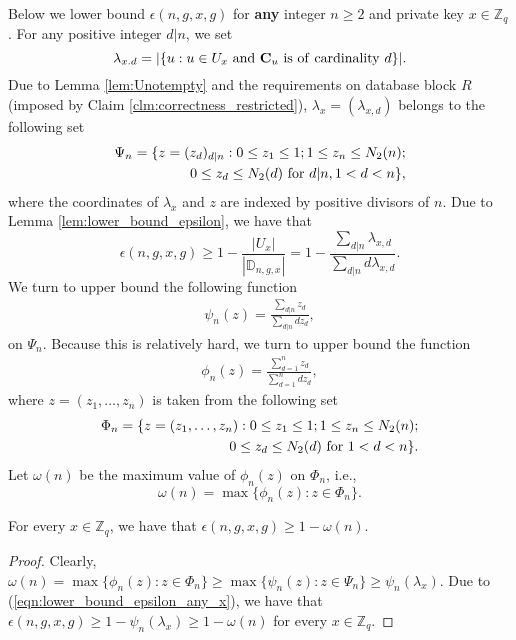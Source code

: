 \documentclass[JMC]{degruyter-journal}
\begin{document}
Below we lower bound $\epsilon(n,g,x,g)$ for {\bf any} integer $n\geq 2$ and  private key $x\in
\mathbb{Z}_q$.
 For any positive integer $d|n$, we
set
 \begin{equation*}
\lambda_{x.d}=|\{u: u\in U_x~{\rm and~} {\bf C}_u {\rm~is~of~cardinality~}d\}|.
 \end{equation*}
Due to Lemma \ref{lem:Unotempty} and the requirements on database
block $R$ (imposed by Claim
 \ref{clm:correctness_restricted}),  $\lambda_x=(\lambda_{x,d})$ belongs to the following set
\begin{equation*}\label{eqn:domain}
\begin{split}
\Psi_n=\{z=(z_d)_{d|n}: 0\leq z_1\leq 1; 1\leq z_n\leq
N_2(n); \\ 0\leq z_d \leq N_2(d) {\rm~for~} d|n, 1<d<n\},
\end{split}
\end{equation*}
where the coordinates of $\lambda_x$ and $z$ are  indexed by
positive divisors of $n$. Due to Lemma
\ref{lem:lower_bound_epsilon}, we have that
\begin{equation}\label{eqn:lower_bound_epsilon_any_x}
\epsilon(n,g,x,g)\geq 1-\frac{|U_x|}{|\mathbb{D}_{n,g,x}|}=
 1-\frac{\sum_{d|n}\lambda_{x,d}}
{\sum_{d|n}d\lambda_{x,d}}.
\end{equation}
We turn to  upper bound the following function
\begin{eqnarray*}
\psi_n(z)=\frac{\sum_{d|n}z_d}{\sum_{d|n}dz_d},
\end{eqnarray*}
on $\Psi_n$. Because this  is relatively hard, we turn to upper
bound the function
\begin{eqnarray*}
\phi_n(z)=\frac{\sum_{d=1}^nz_d}{\sum_{d=1}^ndz_d},
\end{eqnarray*}
where  $z=(z_1,\ldots, z_n)$ is taken from the following set
\begin{equation*}\label{eqn:domain}
\begin{split}
\Phi_n=\{z=(z_1,\ldots,z_n): 0\leq z_1\leq 1; 1\leq z_n\leq
N_2(n); \\ 0\leq z_d \leq N_2(d) {\rm~for~} 1<d<n\}.
\end{split}
\end{equation*}
Let $\omega(n)$ be the maximum value of $\phi_n(z)$ on $\Phi_n$,
i.e.,
\begin{equation*}
\omega(n)=\max\{\phi_n(z): z\in \Phi_n\}.
\end{equation*}


\begin{lemma}\label{lem:lower_bound_large_x}
For every $x\in \mathbb{Z}_q$, we have that $\epsilon(n,g,x,g)\geq
1-\omega(n)$.
\end{lemma}
\begin{proof}
Clearly, $\omega(n)=\max\{\phi_n(z): z\in \Phi_n\} \geq
\max\{\psi_n(z): z\in \Psi_n\}\geq \psi_n(\lambda_x)$. Due to
 (\ref{eqn:lower_bound_epsilon_any_x}), we have that
$\epsilon(n,g,x,g)\geq 1-\psi_n(\lambda_x)\geq  1-\omega(n)$ for
every $x\in \mathbb{Z}_q$.
\end{proof}
\end{document}
